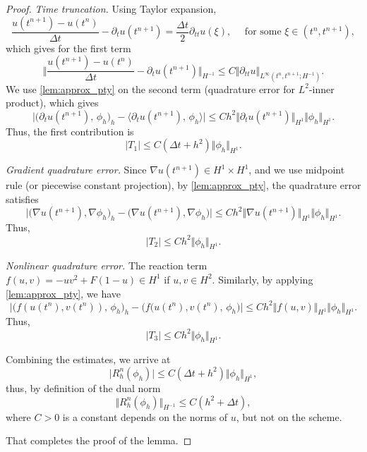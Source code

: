 \documentclass[11pt, a4paper]{amsart}
\newcommand{\la}{\langle}
\newcommand{\ra}{\rangle}
\numberwithin{equation}{section}
\begin{document}
\begin{proof}
		\textit{Time truncation.} 
		Using Taylor expansion,
		\begin{equation*}
			\frac{u(t^{n+1}) - u(t^n)}{\Delta t} - \partial_t u(t^{n+1})  = \frac{\Delta t}{2}\partial_{tt}u(\xi),\quad\mbox{ for some } \xi\in (t^{n}, t^{n+1}),
		\end{equation*}
		which gives for the first term
		\begin{equation*}
			\bigg\Vert \frac{u(t^{n+1}) - u(t^n)}{\Delta t} - \partial_t u(t^{n+1}) \bigg\Vert_{H^{-1}}\leq C\Vert \partial_{tt}u\Vert_{L^\infty(t^n,t^{n+1}; H^{-1})}.
		\end{equation*}
		We use \cref{lem:approx_pty} on the second term (quadrature error for $L^2$-inner product), which gives
		\begin{equation*}
			\big\vert  \big(\partial_t u(t^{n+1}),\, \phi_h\big)_h - \big\la\partial_t u(t^{n+1}),\, \phi_h \big\ra\big\vert \leq Ch^2\big\Vert \partial_t u(t^{n+1})\big\Vert_{H^1}\Vert \phi_h\Vert_{H^1}.
		\end{equation*}
		Thus, the first contribution is
		\begin{equation*}
			\vert T_1\vert\leq C(\Delta t + h^2) \Vert \phi_h\Vert_{H^1}.
		\end{equation*}
		
		\textit{Gradient quadrature error.} Since $\nabla u(t^{n+1})\in H^1\times H^1$, and  we use midpoint rule (or piecewise constant projection), by \cref{lem:approx_pty}, the quadrature error satisfies
		\begin{equation*}
			\big\vert   \big( \nabla u(t^{n+1}), \nabla \phi_h \big)_h-   \big( \nabla u(t^{n+1}), \nabla \phi_h \big)\big\vert \leq C h^2\Vert \nabla u(t^{n+1})\Vert_{H^{1}}\Vert \phi_h\Vert_{H^1}.
		\end{equation*}
		Thus, 
		\begin{equation*}
			\vert T_2\vert\leq Ch^2\Vert \phi_h\Vert_{H^{1}}.
		\end{equation*}
		
		\textit{Nonlinear quadrature error.} The reaction term $f(u,v) = -uv^2 + F(1-u)\in H^1$ if $u,v\in H^2$. Similarly, by applying \cref{lem:approx_pty}, we have
		\begin{equation*}
			\big\vert  \big(f(u(t^n),v(t^n)), \, \phi_h \big)_h - \big(f(u(t^n),v(t^n), \, \phi_h\big)\big\vert \leq Ch^2\Vert f(u,v)\Vert_{H^1}\Vert \phi_h\Vert_{H^{1}}.
		\end{equation*}
		Thus, 
		\begin{equation*}
			\vert T_3\vert \leq Ch^2\Vert \phi_h\Vert_{H^{1}}.
		\end{equation*}
		
		Combining the estimates, we arrive at
		\begin{equation*}
			\vert R_h^n(\phi_h)\vert \leq C(\Delta t + h^2)\Vert \phi_h\Vert_{H^{1}},
		\end{equation*}
		thus, by definition of the dual norm
		\begin{equation*}
			\Vert R_h^n(\phi_h)\Vert_{H^{-1}}\leq C(h^2 + \Delta t),
		\end{equation*}
		where $C>0$ is a constant depends on the norms of $u$, but not on the scheme.
		
		That completes the proof of the lemma.
	\end{proof}
\end{document}
